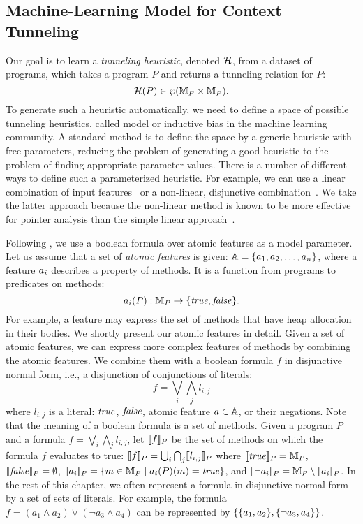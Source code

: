 \subsection{Machine-Learning Model for Context Tunneling}



Our goal is to learn a {\em tunneling heuristic}, denoted
$\mathcal{H}$, from a dataset of programs, which takes a program $P$
and returns a tunneling relation for $P$:
\[
  \mathcal{H}(P) \in \wp({\mathbb{M}}_P \times {\mathbb{M}}_P).
\]
To generate such a heuristic automatically, we need to define a space
of possible tunneling heuristics, called model or inductive bias in
the machine learning community.  A standard
method is to define the space by a generic heuristic with free
parameters, reducing the problem of generating a good heuristic to the
problem of finding appropriate parameter values.  There is a number of
different ways to define such a parameterized heuristic. For example,
we can use a linear combination of input features~\cite{Oh2015} or a
non-linear, disjunctive combination~\cite{JeJeChOh17}. We take the latter approach because the
non-linear method is known to be more effective for pointer analysis
than the simple linear approach~\cite{JeJeChOh17}.

Following \cite{JeJeChOh17},
we use a boolean formula over atomic features as a model parameter.
Let us assume that a set of {\em atomic features} is given:
$\mathbb{A} = \{ a_1, a_2, \dots, a_n \}$, where a feature $a_i$ describes a property of
methods. It is a function from programs to predicates on
methods:
\[
a_i(P) : {\mathbb{M}}_P \to \{ {\it true},{\it false} \}.
\]
For example, a feature may express the set of methods that have
heap allocation in their bodies. We shortly present our atomic features in
detail.
Given a set of atomic features, we can express more complex features
of methods by combining the atomic features.
We combine them with
a boolean formula $f$ in disjunctive normal form, i.e., a disjunction of conjunctions
of literals:
\[
f = \bigvee_i \bigwedge_j l_{i,j}
\]
where $l_{i,j}$ is a literal: ${\it true}$, ${\it false}$, atomic feature $a \in \mathbb{A}$,
or their negations.
Note that the meaning of a boolean formula is a set of methods.
Given a program $P$ and a formula $f =\bigvee_i \bigwedge_j l_{i,j}$, let $[\![f]\!]_P$ be the set of methods
on which the formula $f$ evaluates to true: $[\![f]\!]_P = \bigcup_i
\bigcap_j [\![l_{i,j}]\!]_P$ where $[\![{\it true}]\!]_P = {\mathbb{M}}_P$,
$[\![{\it false}]\!]_P = \emptyset$, $[\![a_i]\!]_P = \{ m \in
 {\mathbb{M}}_P \mid a_i(P)(m) = {\it true} \}$, and $[\![\neg a_i]\!]_P =
 {\mathbb{M}}_P \setminus [\![a_i]\!]_P$.
In the rest of this chapter, we often represent a formula in
disjunctive normal form by a set of sets of literals. For example, the formula
$f = (a_1 \land a_2) \vee (\neg a_3 \land a_4)$ can be
represented by $\{ \{ a_1,a_2 \}, \{ \neg a_3,a_4 \} \}$.



